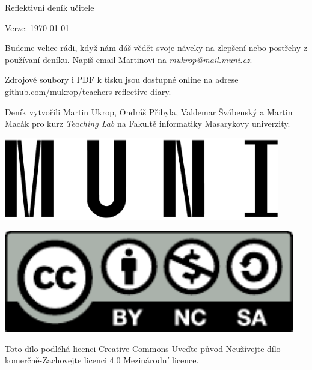 \documentclass[twoside,openany]{book}
\begin{document}







\newpage
\vspace*{\fill}
Reflektivní deník učitele

Verze: \today

\bigskip
Budeme velice rádi, když nám dáš vědět svoje náveky na zlepšení nebo postřehy z používaní deníku. Napiš email Martinovi na \textit{mukrop@mail.muni.cz}.

Zdrojové soubory i PDF k tisku jsou dostupné online na adrese \url{github.com/mukrop/teachers-reflective-diary}.

\bigskip
\begin{minipage}{0.68\textwidth}
Deník vytvořili Martin Ukrop, Ondráš Přibyla, Valdemar Švábenský a Martin Macák pro kurz \textit{Teaching Lab} na Fakultě informatiky Masarykovy univerzity.
\end{minipage}
\begin{minipage}[t]{0.32\textwidth}
\hfill\includegraphics[width=0.90\textwidth]{../img/muni}
\end{minipage}

\begin{minipage}{0.32\textwidth}
\includegraphics[width=0.95\textwidth]{../img/cc-by-nc-sa}
\end{minipage}
\begin{minipage}{0.68\textwidth}
Toto dílo podléhá licenci Creative Commons Uveďte původ-Neužívejte dílo komerčně-Zachovejte licenci 4.0 Mezinárodní licence.
\end{minipage}

\newpage
\thispagestyle{empty}
\mbox{}
\newpage
\thispagestyle{empty}
\mbox{}
\end{document}
